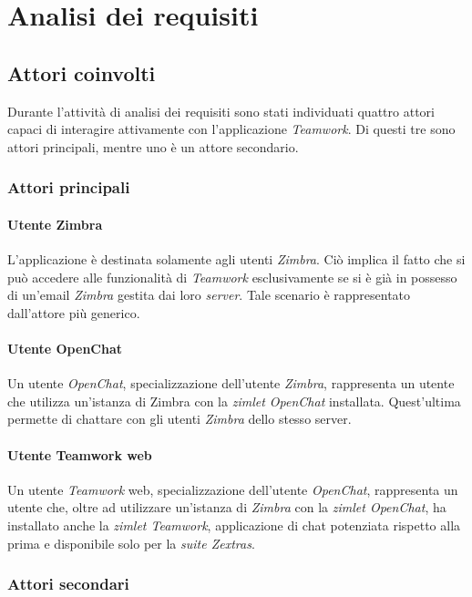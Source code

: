 
\chapter{Analisi dei requisiti}\label{chap:requirements}

\section{Attori coinvolti}
Durante l'attività di analisi dei requisiti sono stati individuati quattro 
attori capaci di interagire attivamente con l'applicazione \emph{Teamwork}. 
Di questi tre sono attori principali, mentre uno è un attore secondario.
\subsection{Attori principali}
\subsubsection{Utente Zimbra}
L'applicazione è destinata solamente agli utenti \emph{Zimbra}. Ciò implica il fatto che si può accedere alle funzionalità di \emph{Teamwork} esclusivamente se si è già in 
possesso di un'email \emph{Zimbra} gestita dai loro \emph{server}. Tale scenario è
rappresentato dall'attore più generico.
\subsubsection{Utente OpenChat}
Un utente \emph{OpenChat}, specializzazione dell'utente \emph{Zimbra}, rappresenta un utente che utilizza un'istanza di Zimbra con la \emph{zimlet OpenChat} installata. Quest'ultima permette di chattare con gli utenti \emph{Zimbra} dello stesso server.

\subsubsection{Utente Teamwork web}
Un utente \emph{Teamwork} web, specializzazione dell'utente \emph{OpenChat}, rappresenta 
un utente che, oltre ad utilizzare un'istanza di \emph{Zimbra} con la \emph{zimlet OpenChat}, 
ha installato anche la \emph{zimlet Teamwork}, applicazione di chat potenziata rispetto 
alla prima e disponibile solo per la \emph{suite Zextras}.

\subsection{Attori secondari}
